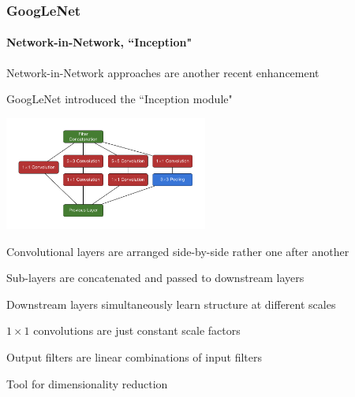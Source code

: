 \documentclass[10pt,professionalfonts,xcolor=table]{beamer}
\begin{document}
\begin{frame}
\frametitle{GoogLeNet}
\framesubtitle{Network-in-Network, ``Inception"}


  \bangon
  \item Network-in-Network approaches are another recent enhancement
  \item GoogLeNet introduced the ``Inception module"
  \bangoff
  \begin{center}
 \includegraphics[width=0.5\textwidth]{figures/figures/inception/inception.pdf}
 \end{center}
   \bangon
  \gap
  \item Convolutional layers are arranged side-by-side rather one after another
  \item Sub-layers are concatenated and passed to downstream layers
  \item Downstream layers simultaneously learn structure at different scales
  \item $1\times1$ convolutions are just constant scale factors
    \bangon
    \item Output filters are linear combinations of input filters
    \item Tool for dimensionality reduction
    \bangoff
  \bangoff

\end{frame}
\end{document}
